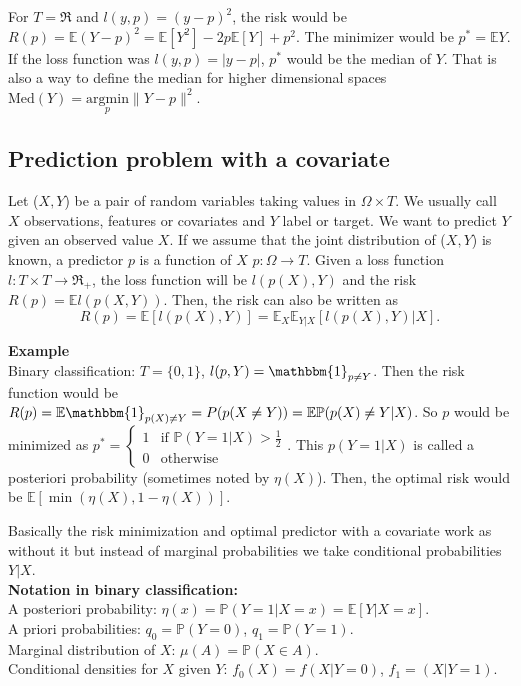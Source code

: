 \documentclass[11pt, english]{article}
\begin{document}
For $ T=\Re$ and $l(y,p)=(y-p)^2$, the risk would be $R(p)=\mathbb{E}(Y-p)^2=\mathbb{E}[Y^2]-2p\mathbb{E}[Y]+p^2$. The minimizer would be $p^*=\mathbb{E}Y$. If the loss function was $l(y,p)=|y-p|$, $p^*$ would be the median of $Y$. That is also a way to define the median for higher dimensional spaces $\text{Med}(Y)=\underset{p}{\text{argmin}}\|Y-p\|^2$.

\subsection{Prediction problem with a covariate}

Let ($X,Y$) be a pair of random variables taking values in $\Omega\times T$. We usually call $X$ observations, features or covariates and $Y$ label or target. We want to predict $Y$ given an observed value $X$. If we assume that the joint distribution of ($X,Y$) is known, a predictor $p$ is a function of $X$ $p:\Omega\rightarrow T$. Given a loss function $l:T\times T\rightarrow \Re_{+}$, the loss function will be $l(p(X),Y)$ and the risk $R(p)=\mathbb{E}l(p(X,Y))$. Then, the risk can also be written as 
\begin{equation}
	R(p)=\mathbb{E}[l(p(X),Y)]=\mathbb{E}_X\mathbb{E}_{Y|X}[l(p(X),Y)|X].
\end{equation}


\textbf{Example\\}
Binary classification: $T=\{0,1\}$, $l(p,Y)=\mathbbm{1}_{p\neq Y}$. Then the risk function would be $R(p)=\mathbb{E}\mathbbm{1}_{p(X)\neq Y}=P(p(X\neq Y))=\mathbb{E}\mathbb{P}(p(X)\neq Y|X)$. So $p$ would be minimized as $p^*=\left\{\begin{array}{ll}
1 & \text{if }\mathbb{P}(Y=1|X)>\frac{1}{2}\\
0 & \text{otherwise}
\end{array}\right.$. This $p(Y=1|X)$ is called a posteriori probability (sometimes noted by $\eta(X)$). Then, the optimal risk would be $\mathbb{E}[\min(\eta(X),1-\eta(X))]$. 

Basically the risk minimization and optimal predictor with a covariate work as without it but instead of marginal probabilities we take conditional probabilities $Y|X$.\\

\textbf{Notation in binary classification:\\}
A posteriori probability: $\eta(x)=\mathbb{P}(Y=1|X=x)=\mathbb{E}[Y|X=x]$.\\
A priori probabilities: $q_0=\mathbb{P}(Y=0)$, $q_1=\mathbb{P}(Y=1)$.\\
Marginal distribution of $X$: $\mu(A)=\mathbb{P}(X\in A)$.\\
Conditional densities for $X$ given $Y$: $f_0(X)=f(X|Y=0)$, $f_1=(X|Y=1)$.\\
\end{document}
